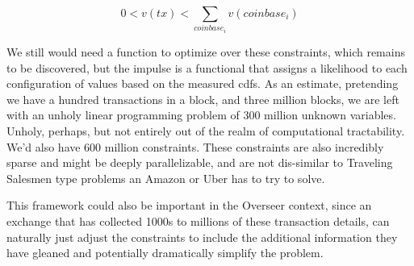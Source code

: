 \begin{equation}
0 < v(tx) < \sum_{coinbase_i} v(coinbase_i)
\end{equation}

We still would need a function to optimize over these constraints, which remains to be discovered, but the impulse is a functional that assigns a likelihood to each configuration of values based on the measured cdfs.  
As an estimate, pretending we have a hundred transactions in a block, and three million blocks, we are left with an unholy linear programming problem of 300 million unknown variables.
Unholy, perhaps, but not entirely out of the realm of computational tractability.  
We'd also have 600 million constraints.
These constraints are also incredibly sparse and might be deeply parallelizable, and are not dis-similar to Traveling Salesmen type problems an Amazon or Uber has to try to solve.

This framework could also be important in the Overseer context, since an exchange that has collected 1000s to millions of these transaction details, can naturally just adjust the constraints to include the additional information they have gleaned and potentially dramatically simplify the problem.  


